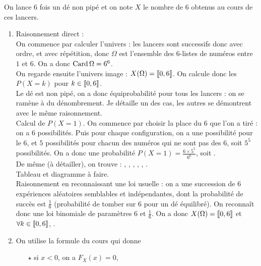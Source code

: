 \documentclass[a4paper, 11pt,reqno]{article}
\begin{document}
\begin{correction}  \;
	On lance 6 fois un d\'e non pip\'e et on note $X$ le nombre de 6 obtenus au cours de ces lancers.
	\begin{enumerate}
		\item Raisonnement direct :\\
		      On commence par calculer l'univers : les lancers sont successifs donc avec ordre, et avec r\'ep\'etition, donc $\Omega$ est l'ensemble des $6$-listes de num\'eros entre $1$ et $6$. On a donc $\operatorname{Card} \Omega = 6^6$.\\
		      On regarde ensuite l'univers image : $X(\Omega) = \llbracket 0,6\rrbracket$. On calcule donc les $P(X=k)$ pour $k \in  \llbracket 0,6\rrbracket$.\\
		      Le d\'e est non pip\'e, on a donc \'equiprobabilit\'e pour tous les lancers : on se ram\`ene \`a du d\'enombrement. Je d\'etaille un des cas, les autres se d\'emontrent avec le m\^eme raisonnement.\\
		      Calcul de $P(X=1)$.  On commence par choisir la place du $6$ que l'on a tir\'e : on a $6$ possibilit\'es. Puis pour chaque configuration, on a une possibilit\'e pour le $6$, et $5$ possibilit\'es pour chacun des num\'eros qui ne sont pas des $6$, soit $5^5$ possibilit\'es. On a donc une probabilit\'e $P(X=1) = \frac{6 \times 5^5}{6^6}$, soit .\\
		      De m\^eme (\`a d\'etailler), on trouve : , , , , , .\vsec\\
		      Tableau et diagramme \`a faire.\\
		      Raisonnement en reconnaissant une loi usuelle : on a une succession de 6 exp\'eriences al\'eatoires semblables et ind\'ependantes, dont la probabilit\'e de succ\`es est $\frac{1}{6}$ (probabilit\'e de tomber sur $6$ pour un d\'e \'equilibr\'e). On reconna\^it donc une loi binomiale de param\`etres $6$ et $\frac{1}{6}$. On a donc $X(\Omega) = \llbracket 0,6\rrbracket$ et $\forall k \in \llbracket 0,6\rrbracket$, .
		\item On utilise la formule du cours qui donne
		      \begin{itemize}
			      \item[$\star$] si $x<0$, on a $F_X(x) = 0$,

\end{itemize}
\end{enumerate}
\end{correction}
\end{document}
